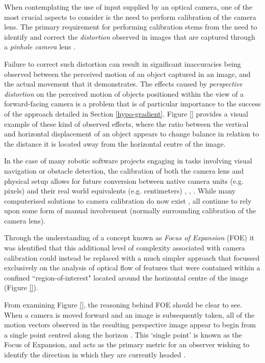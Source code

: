When contemplating the use of input supplied by an optical camera, one of the most crucial aspects to consider is the need to perform calibration of the camera lens. The primary requirement for performing calibration stems from the need to identify and correct the \textit{distortion} observed in images that are captured through a \textit{pinhole camera} lens \cite{camera-calib}. 

Failure to correct such distortion can result in significant inaccuracies being observed between the perceived motion of an object captured in an image, and the actual movement that it demonstrates. The effects caused by \textit{perspective distortion} on the perceived motion of objects positioned within the view of a forward-facing camera is a problem that is of particular importance to the success of the approach detailed in Section \ref{hypo-gradient}. Figure \ref{} provides a visual example of these kind of observed effects, where the ratio between the vertical and horizontal displacement of an object appears to change balance in relation to the distance it is located away from the horizontal centre of the image.


In the case of many robotic software projects engaging in tasks involving visual navigation or obstacle detection, the calibration of both the camera lens and physical setup allows for future conversion between native camera units (e.g. pixels) and their real world equivalents (e.g. centimeters) \cite{campbell}, \cite{low}, \cite{}. While many computerised solutions to camera calibration do now exist \cite{camera-calib}, all continue to rely upon some form of manual involvement (normally surrounding calibration of the camera lens). 

Through the understanding of a concept known as \textit{Focus of Expansion} (FOE) it was identified that this additional level of complexity associated with camera calibration could instead be replaced with a much simpler approach that focussed exclusively on the analysis of optical flow of features that were contained within a confined ``region-of-interest" located around the horizontal centre of the image (Figure \ref{}).

From examining Figure \ref{}, the reasoning behind FOE should be clear to see. When a camera is moved forward and an image is subsequently taken, all of the motion vectors observed in the resulting perspective image appear to begin from a single point centred along the horizon \cite{stanford-cs}. This `single point' is known as the Focus of Expansion, and acts as the primary metric for an observer wishing to identify the direction in which they are currently headed \cite{texas-cs}. 

